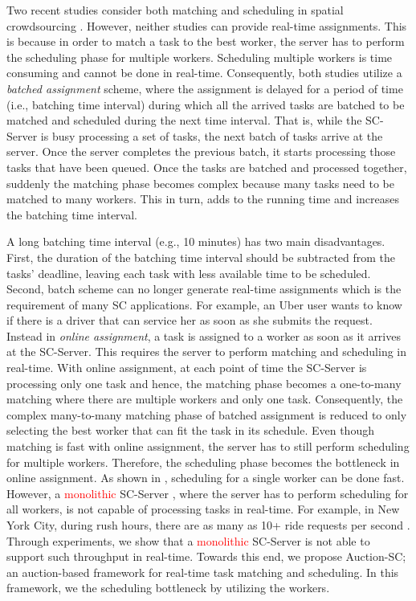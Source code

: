 Two recent studies consider both matching and scheduling in spatial crowdsourcing \cite{Deng15, Chen15}. However, neither studies can provide real-time assignments. This is because in order to match a task to the best worker, the server has to perform the scheduling phase for multiple workers. Scheduling multiple workers is time consuming and cannot be done in real-time. Consequently, both studies utilize a \textit{batched assignment} scheme, where the assignment is delayed for a period of time (i.e., batching time interval) during which all the arrived tasks are batched to be matched and scheduled during the next time interval. That is, while the SC-Server is busy processing a set of tasks, the next batch of tasks arrive at the server. Once the server completes the previous batch, it starts processing those tasks that have been queued. Once the tasks are batched and processed together, suddenly the matching phase becomes complex because many tasks need to be matched to many workers. This in turn, adds to the running time and increases the batching time interval.

A long batching time interval (e.g., 10 minutes) has two main disadvantages.  First, the duration of the batching time interval should be subtracted from the tasks' deadline, leaving each task with less available time to be scheduled. Second, batch scheme can no longer generate real-time assignments which is the requirement of many SC applications. For example, an Uber user wants to know if there is a driver that can service her as soon as she submits the request. Instead in \textit{online assignment}, a task is assigned to a worker as soon as it arrives at the SC-Server. This requires the server to perform matching and scheduling in real-time. With online assignment, at each point of time the SC-Server is processing only one task and hence, the matching phase becomes a one-to-many matching where there are multiple workers and only one task. Consequently, the complex many-to-many matching phase of batched assignment is reduced to only selecting the best worker that can fit the task in its schedule. Even though matching is fast with online assignment, the server has to still perform scheduling for multiple workers. Therefore, the scheduling phase becomes the bottleneck in online assignment. As shown in \cite{Li15}, scheduling for a single worker can be done fast. However, a \textcolor{red}{monolithic} SC-Server \cite{Stephens15}, where the server has to perform scheduling for all workers, is not capable of processing tasks in real-time. For example, in New York City, during rush hours, there are as many as 10+ ride requests per second \cite{NYCTaxi}. Through experiments, we show that a \textcolor{red}{monolithic} SC-Server is not able to support such throughput in real-time. Towards this end, we propose Auction-SC; an auction-based framework for real-time task matching and scheduling. In this framework, we the scheduling bottleneck by utilizing the workers.

